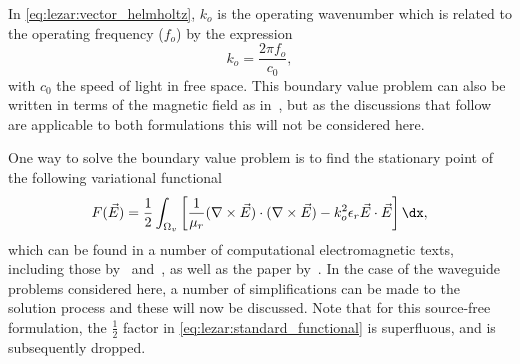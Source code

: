 In \eqref{eq:lezar:vector_helmholtz}, $k_o$ is the operating
wavenumber which is related to the
operating frequency ($f_o$) by the expression
\begin{equation}
  \label{eq:lezar:operating_wavenumber}
 k_o = \frac{2\pi f_o}{c_0},
\end{equation}
with $c_0$ the speed of light in free space.  This boundary value
problem can also be written in terms of the magnetic field as
in~\citet{Jin2002}, but as the discussions that follow are applicable
to both formulations this will not be considered here.

One way to solve the boundary value problem is to find the stationary
point of the following variational functional
\begin{equation}
  \label{eq:lezar:standard_functional}
  F(\vec{E})
      = \frac{1}{2}\int_{\Omega_v} \left[ \frac{1}{\mu_r}(\nabla\times{\vec{E}})\cdot(\nabla\times{\vec{E}})
      - k_o^2\epsilon_r\vec{E}\cdot{\vec{E}} \right] \dx,
\end{equation}
which can be found in a number of computational electromagnetic texts,
including those by~\citet{Jin2002}
and~\citet{PelosiCoccioliSelleri1998}, as well as the paper
by~\citet{LeeSunCendes1991}. In the case of the waveguide problems
considered here, a number of simplifications can be made to the
solution process and these will now be discussed. Note that for this
source-free formulation, the $\frac{1}{2}$ factor
in \eqref{eq:lezar:standard_functional} is superfluous, and is
subsequently dropped.

